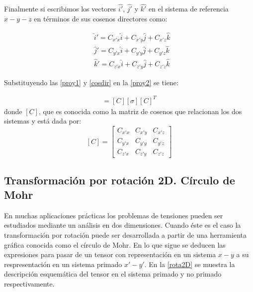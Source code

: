 \documentclass[../notas medios.tex]{subfiles}
\begin{document}
%
Finalmente si escribimos los vectores $\hat{i'}$, $\hat{j'}$ y $\hat{k'}$ en el sistema de referencia $x-y-z$ en términos de sus cosenos directores como:

\begin{equation}
\begin{aligned}
&\hat i' = {C_{x'x}}\hat i + {C_{x'y}}\hat j + {C_{x'z}}\hat k \\
&\hat j' = {C_{y'x}}\hat i + {C_{y'y}}\hat j + {C_{y'z}}\hat k \\
&\hat k' = {C_{z'x}}\hat i + {C_{z'y}}\hat j + {C_{z'z}}\hat k
\end{aligned}
\label{cosdir}
\end{equation}

Substituyendo las \cref{proy1} y \cref{cosdir} en la \cref{proy2} se tiene:

%
\begin{align}
[\sigma'] = [C] [\sigma] {[C]^T}
\label{rotacion}
\end{align}
%
donde $[C]$,  que es conocida como la matriz de cosenos que relacionan los dos
sistemas y está dada por: \\
\[
[C]
= 
\begin{bmatrix}
    C_{x'x} & C_{x'y} & C_{x'z} \\
    C_{y'x} & C_{y'y} & C_{y'z} \\
    C_{z'x} & C_{z'y} & C_{z'z}
\end{bmatrix}
\]

\subsection{Transformación por rotación 2D. Círculo de Mohr}
%
En muchas aplicaciones prácticas los problemas de tensiones pueden ser estudiados mediante un análisis en dos dimensiones. Cuando éste es el caso la transformación por rotación puede ser desarrollada a partir de una herramienta gráfica conocida como el círculo de Mohr.  En lo que sigue se deducen las expresiones para pasar de un tensor con representación en un sistema $x-y$ a su respresentación en un sistema primado $x'-y'$. En la \cref{rota2D} se muestra la descripción esquemática del tensor en el sistema primado y no primado respectivamente. 
\end{document}
